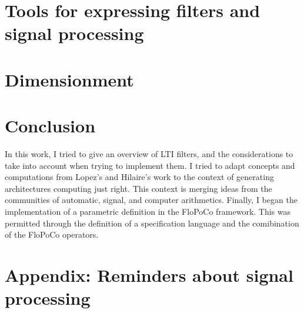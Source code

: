 \documentclass[twoside]{article}
\theoremstyle{remark}
\numberwithin{equation}{subsection}
\begin{document}
\section{Tools for expressing filters and signal processing}


\newpage
\section{Dimensionment}


%

\section*{Conclusion}
	In this work, I tried to give an overview of LTI filters, and the considerations to take into account when trying to implement them.
	I tried to adapt concepts and computations from Lopez's and Hilaire's work to the context of generating architectures computing just right.
	This context is merging ideas from the communities of automatic, signal, and computer arithmetics.
	Finally, I began the implementation of a parametric definition in the FloPoCo framework.
	This was permitted through the definition of a specification language and the comibination of the FloPoCo operators.


\newpage
\section*{Appendix: Reminders about signal processing}

\end{document}
